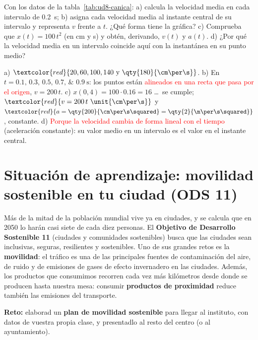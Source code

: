 \begin{exercise}
    Con los datos de la tabla~\ref{tab:ud8-canica}: a) calcula la velocidad media en cada intervalo de \qty{0.2}{\s}; b) asigna
    cada velocidad media al instante central de su intervalo y representa \(v\) frente a \(t\). ¿Qué forma tiene la gráfica?
    c) Comprueba que \(x(t) = 100\,t^2\) (en cm y s) y obtén, derivando, \(v(t)\) y \(a(t)\). d) ¿Por qué la velocidad media en un
    intervalo coincide aquí con la instantánea en su punto medio?
    \begin{solu}
        a) \(\textcolor{red}{20, 60, 100, 140~\text{y}~\qty{180}{\cm\per\s}}\). b) En \(t = \numlist{0.1;0.3;0.5;0.7;0.9}~\unit{\s}\):
        los puntos están \textcolor{red}{alineados en una recta que pasa por el origen}, \(v = 200\,t\). c) \(x(0{,}4) = 100 \cdot
        \num{0.16} = 16\) \ldots\ se cumple; \(\textcolor{red}{v = 200\,t~\unit{\cm\per\s}}\) y \(\textcolor{red}{a = \qty{200}{\cm\per\s\squared}
        = \qty{2}{\m\per\s\squared}}\), constante. d) \textcolor{red}{Porque la velocidad cambia de forma lineal con el tiempo}
        (aceleración constante): su valor medio en un intervalo es el valor en el instante central.
    \end{solu}
\end{exercise}

\section{Situación de aprendizaje: movilidad sostenible en tu ciudad (ODS 11)}\label{sec:ud8-ods}

Más de la mitad de la población mundial vive ya en ciudades, y se calcula que en 2050 lo harán casi siete de cada diez personas. El
\textbf{Objetivo de Desarrollo Sostenible 11} (ciudades y comunidades sostenibles) busca que las ciudades sean inclusivas, seguras,
resilientes y sostenibles. Uno de sus grandes retos es la \textbf{movilidad}: el tráfico es una de las principales fuentes de
contaminación del aire, de ruido y de emisiones de gases de efecto invernadero en las ciudades. Además, los productos que consumimos
recorren cada vez más kilómetros desde donde se producen hasta nuestra mesa: consumir \textbf{productos de proximidad} reduce
también las emisiones del transporte.

\begin{marker}
    \textbf{Reto:} elaborad un \textbf{plan de movilidad sostenible} para llegar al instituto, con datos de vuestra propia clase,
    y presentadlo al resto del centro (o al ayuntamiento).
\end{marker}

